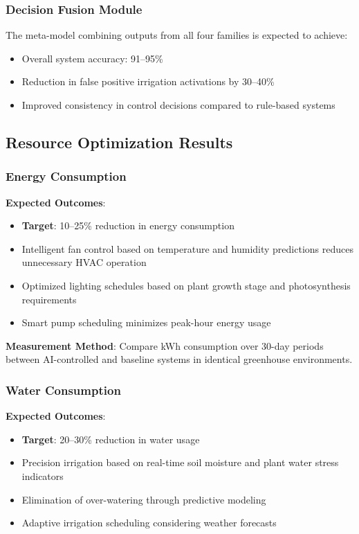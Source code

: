 \documentclass[conference]{IEEEtran}
\begin{document}
\subsubsection{Decision Fusion Module}

The meta-model combining outputs from all four families is expected to achieve:
\begin{itemize}
\item Overall system accuracy: 91--95\%
\item Reduction in false positive irrigation activations by 30--40\%
\item Improved consistency in control decisions compared to rule-based systems
\end{itemize}

\subsection{Resource Optimization Results}

\subsubsection{Energy Consumption}

\textbf{Expected Outcomes}:
\begin{itemize}
\item \textbf{Target}: 10--25\% reduction in energy consumption
\item Intelligent fan control based on temperature and humidity predictions reduces unnecessary HVAC operation
\item Optimized lighting schedules based on plant growth stage and photosynthesis requirements
\item Smart pump scheduling minimizes peak-hour energy usage
\end{itemize}

\textbf{Measurement Method}: Compare kWh consumption over 30-day periods between AI-controlled and baseline systems in identical greenhouse environments.

\subsubsection{Water Consumption}

\textbf{Expected Outcomes}:
\begin{itemize}
\item \textbf{Target}: 20--30\% reduction in water usage
\item Precision irrigation based on real-time soil moisture and plant water stress indicators
\item Elimination of over-watering through predictive modeling
\item Adaptive irrigation scheduling considering weather forecasts
\end{itemize}
\end{document}
